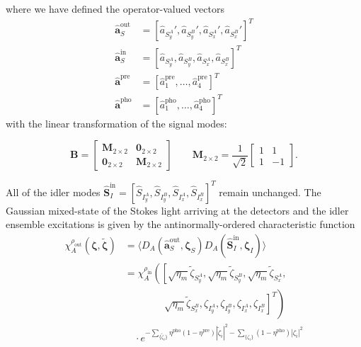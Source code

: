 \documentclass[aps,twocolumn,secnumarabic,amsmath,amssymb,pra,groupedaddress,
showpacs, showkeys,draft]{revtex4-1}
\newcommand{\pna}[1]{\left(#1\right)}
\newcommand{\pnb}[1]{\left[#1\right]}
\newcommand{\eqn}[1]{
\begin{equation}
	#1
\end{equation}
}
\begin{document}
where we have defined the operator-valued vectors
\begin{align}
	\mathbf{\hat{a}}^{\textrm{out}}_S&=\pnb{\hat{a}_{S^A_y}',\hat{a}_{S^B_y}',\hat{a}_{S^A_x}',\hat{a}_{S^B_x}'}^{{T}} \nonumber\\
	\mathbf{\hat{a}}_{S}^{\textrm{in}}&=\pnb{\hat{a}_{S^A_y},\hat{a}_{S^B_y},\hat{a}_{S^A_x},\hat{a}_{S^B_x}}^{{T}} \nonumber\\
	\mathbf{\hat{a}}^{\textrm{pre}}&=\pnb{\hat{a}_1^{\textrm{pre}},\ldots, \hat{a}_4^{\textrm{pre}}}^{{T}} \nonumber\\
	\mathbf{\hat{a}}^{\textrm{pho}}&=\pnb{\hat{a}^{\textrm{pho}}_1,\ldots, \hat{a}^{\textrm{pho}}_4}^{{T}}
\end{align}
with the linear transformation of the signal modes:
\eqn{ 
\mathbf{B}=
\left[ 
\begin{array}{cc}
\mathbf{M}_{2\times 2} & \mathbf{0}_{2\times 2} \\
\mathbf{0}_{2\times 2} & \mathbf{M}_{2\times 2}
\end{array} 
\right]
\qquad 
\mathbf{M}_{2\times 2}=
\frac{1}{\sqrt{2}}\left[ 
\begin{array}{cc}
1 & 1 \\
1 & -1\end{array} \right].\label{eqn:chap3:linear_beamsplitter}}
All of the idler modes
$\mathbf{\hat{S}}_{{I}}^{\textrm{in}}=\pnb{\hat{S}_{I^A_y},\hat{S}_{I^B_y},\hat{S}_{I^A_x},\hat{S}_{I^B_x}}^{{T}}$
remain unchanged. The Gaussian mixed-state of the Stokes light arriving at the
detectors and the idler ensemble excitations is given by the
antinormally-ordered characteristic function
\begin{align}
	\chi_A^{\rho_{\textrm{out}}}\pna{\bm{\zeta}, \bm{\tilde{\zeta}}} & =\langle D_A\pna{\mathbf{\hat{a}}_S^{\textrm{out}}, \bm{\zeta}_S} D_A\pna{\mathbf{\hat{S}}_I^{\textrm{in}}, \bm{\zeta}_I} \rangle\nonumber \\
	& =
        \chi_A^{\rho_{\textrm{in}}}\left(
          \left[\sqrt{\eta_{m}}\tilde{\zeta}_{S^A_y},\sqrt{\eta_{m}}\tilde{\zeta}_{S^B_y},\sqrt{\eta_{m}}\tilde{\zeta}_{S^A_x},
            \right.\right.\nonumber \\
    & \left.{}\left.{}\qquad\qquad\sqrt{\eta_{m}}\tilde{\zeta}_{S^B_x}, \zeta_{I^A_y},\zeta_{I^B_y},\zeta_{I^A_x},\zeta_{I^B_x} \right] ^{T}\right) \nonumber \\
    & \quad \cdot e^{-\sum_{\{\tilde{\zeta}_i\}}\eta^{\textrm{pho}}\pna{1- \eta^{\textrm{pre}}}|\tilde{\zeta}_i|^2-\sum_{\{{\zeta}_i\}}\pna{1-\eta^{\textrm{pho}}}|{\zeta}_i|^2} \label{eqn:chap3:chia_orig}
\end{align}
\end{document}
